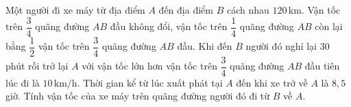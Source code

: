 \begin{ex}%
Một người đi xe máy từ địa điểm $A$ đến địa điểm $B$ cách nhau $120\mathrm{\, km}$. Vận
tốc trên $\dfrac{3}{4}$ quãng đường $AB$ đầu không đổi, vận tốc trên $\dfrac{1}{4}$ quãng đường $AB$ còn lại bằng $\dfrac{1}{2}$ vận tốc trên $\dfrac{3}{4}$ quãng đường $AB$ đầu. Khi đến $B$ người đó nghỉ lại $30$ phút rồi trở lại $A$ với vận tốc lớn hơn vận tốc trên $\dfrac{3}{4}$ quãng đường $AB$ đầu tiên lúc đi là $10\mathrm{\, km/h}$. Thời gian kể từ lúc xuất phát tại $A$ đến khi xe trở về $A$ là $8,5$ giờ. Tính vận tốc của xe máy trên quãng đường người đó đi từ $B$ về $A$.
\end{ex}

